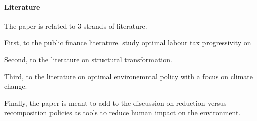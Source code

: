 \paragraph{Literature}

The paper is related to 3 strands of literature. 

First, to the public finance literature.  \cite{Heathcote2017OptimalFramework} study optimal labour tax progressivity on 

Second, to the literature on structural transformation. 

Third, to the literature on optimal environemntal policy with a focus on climate change. 

Finally, the paper is meant to add to the discussion on reduction versus recomposition policies as tools to reduce human impact on the environment. 